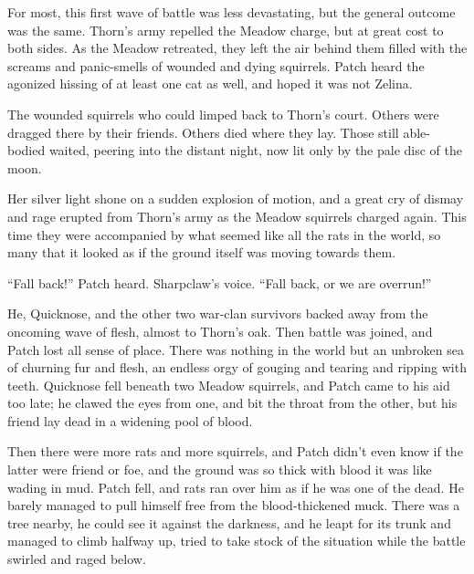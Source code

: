 \documentclass[ebook,oneside,openany,17pt]{memoir}
\newenvironment{tolerant}[1]{%
  \par\tolerance=#1\relax
}{%
  \par
}
\begin{document}
\begin{tolerant}{1000}
For most, this first wave of battle was less devastating, but the
general outcome was the same. Thorn’s army repelled the Meadow charge,
but at great cost to both sides. As the Meadow retreated, they left
the air behind them filled with the screams and panic-smells of
wounded and dying squirrels. Patch heard the agonized hissing of at
least one cat as well, and hoped it was not Zelina.
\end{tolerant}

The wounded squirrels who could limped back to Thorn’s court. Others
were dragged there by their friends. Others died where they lay. Those
still able-bodied waited, peering into the distant night, now lit only
by the pale disc of the moon.

\begin{tolerant}{500}
Her silver light shone on a sudden explosion of motion, and a great
cry of dismay and rage erupted from Thorn’s army as the Meadow
squirrels charged again. This time they were accompanied by what
seem\-ed like all the rats in the world, so many that it looked as if
the ground itself was moving towards them.
\end{tolerant}

“Fall back!” Patch heard. Sharpclaw’s voice. “Fall back, or we are
overrun!”

He, Quicknose, and the other two war-clan survivors backed away from
the oncoming wave of flesh, almost to Thorn’s oak. Then battle was
joined, and Patch lost all sense of place. There was nothing in the
world but an unbroken sea of churning fur and flesh, an endless orgy
of gouging and tearing and ripping with teeth. Quicknose fell beneath
two Meadow squirrels, and Patch came to his aid too late; he clawed
the eyes from one, and bit the throat from the other, but his friend
lay dead in a widening pool of blood.

\begin{tolerant}{500}
Then there were more rats and more squirrels, and Patch didn’t even
know if the latter were friend or foe, and the ground was so thick
with blood it was like wading in mud. Patch fell, and rats ran over
him as if he was one of the dead. He barely managed to pull himself
free from the blood-thickened muck. There was a tree nearby, he could
see it against the darkness, and he leapt for its trunk and managed to
climb half\-way up, tried to take stock of the situation while the
battle swirled and raged below.
\end{tolerant}
\end{document}
